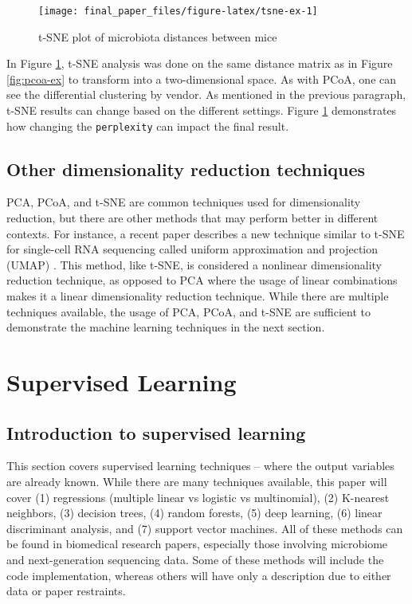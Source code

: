 \documentclass[12pt,openany]{book}
\begin{document}
\begin{figure}
\texttt{[image: final\_paper\_files/figure-latex/tsne-ex-1]} \caption{t-SNE plot of microbiota distances between mice}\label{fig:tsne-ex}
\end{figure}

In Figure \ref{fig:tsne-ex}, t-SNE analysis was done on the same
distance matrix as in Figure \ref{fig:pcoa-ex} to transform into a
two-dimensional space. As with PCoA, one can see the differential
clustering by vendor. As mentioned in the previous paragraph, t-SNE
results can change based on the different settings. Figure
\ref{fig:tsne-ex} demonstrates how changing the \texttt{perplexity} can
impact the final result.

\section{Other dimensionality reduction
techniques}\label{other-dimensionality-reduction-techniques}

PCA, PCoA, and t-SNE are common techniques used for dimensionality
reduction, but there are other methods that may perform better in
different contexts. For instance, a recent paper describes a new
technique similar to t-SNE for single-cell RNA sequencing called uniform
approximation and projection (UMAP) \citep{becht2018dimensionality}.
This method, like t-SNE, is considered a nonlinear dimensionality
reduction technique, as opposed to PCA where the usage of linear
combinations makes it a linear dimensionality reduction technique. While
there are multiple techniques available, the usage of PCA, PCoA, and
t-SNE are sufficient to demonstrate the machine learning techniques in
the next section.

\chapter{Supervised Learning}\label{sup_learn}

\section{Introduction to supervised
learning}\label{introduction-to-supervised-learning}

This section covers supervised learning techniques -- where the output
variables are already known. While there are many techniques available,
this paper will cover (1) regressions (multiple linear vs logistic vs
multinomial), (2) K-nearest neighbors, (3) decision trees, (4) random
forests, (5) deep learning, (6) linear discriminant analysis, and (7)
support vector machines. All of these methods can be found in biomedical
research papers, especially those involving microbiome and
next-generation sequencing data. Some of these methods will include the
code implementation, whereas others will have only a description due to
either data or paper restraints.
\end{document}
